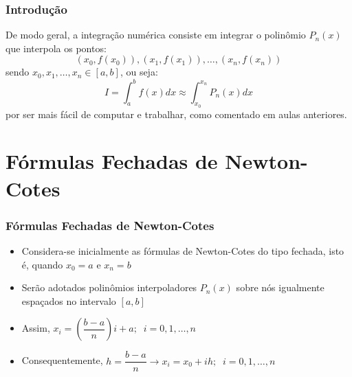 \documentclass{beamer}
\theoremstyle{mystyle}
\begin{document}
	\begin{frame}
		\frametitle{Introdução}	
		De modo geral, a integração numérica consiste em integrar o polinômio $ P_{n} (x) $ que interpola os pontos:
		\begin{equation*}
			 (x_{0},f(x_{0})),(x_{1},f(x_{1})),\ldots,(x_{n},f(x_{n}))
		\end{equation*}
		sendo $ x_{0},x_{1},\ldots,x_{n}\in [a,b]  $, ou seja: 
		\begin{equation*}
			I = \int_{a}^{b} f(x) dx \approx \int_{x_{0}}^{x_{n}} P_{n}(x) dx
		\end{equation*}
		por ser mais fácil de computar e trabalhar, como comentado em aulas anteriores.
	\end{frame}

\section{Fórmulas Fechadas de Newton-Cotes}

	\begin{frame}
		\frametitle{Fórmulas Fechadas de Newton-Cotes}
		\begin{itemize}
			\item Considera-se inicialmente as fórmulas de Newton-Cotes do	tipo fechada, isto é, quando $ x_{0} = a $ e $ x_{n} = b $
			\item Serão adotados polinômios interpoladores $ P_{n} (x) $ sobre nós igualmente espaçados no intervalo $ [a, b] $
			\item Assim, $ x_{i} = \left( \dfrac{b-a}{n}\right) i + a;\;\; i = 0,1,\ldots,n  $
			\item Consequentemente, $ h = \dfrac{b-a}{n} \rightarrow x_{i} = x_{0} + ih;\;\; i = 0,1,\ldots,n  $
		\end{itemize}
	\end{frame}
	
\end{document}
